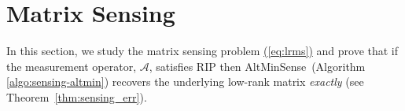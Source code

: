 \documentclass[11pt]{article}
\renewcommand{\eqref}[1]{\hyperref[#1]{(\ref*{#1})}}
\theoremstyle{plain}
\theoremstyle{definition}
\newcommand{\aff}{{\mathcal A}}
\newcommand{\as}{AltMinSense\ }
\begin{document}
%
%


\section{Matrix Sensing}\label{sec:sensing}
In this section, we  study the matrix sensing problem \eqref{eq:lrms} and prove that if the measurement operator, $\aff$, satisfies RIP then \as (Algorithm \ref{algo:sensing-altmin}) recovers the underlying low-rank matrix {\em exactly} (see Theorem~\ref{thm:sensing_err}).
\end{document}
